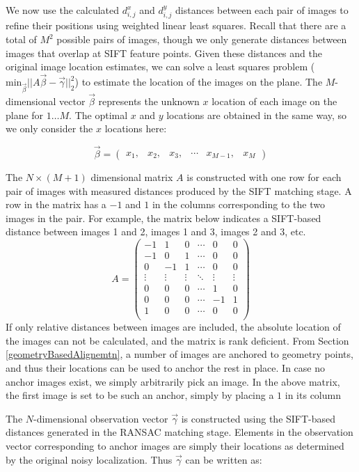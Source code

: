 \documentclass[]{spie}  %
\begin{document}
We now use the calculated $d^x_{i,j}$ and $d^y_{i,j}$ distances
between each pair of images to refine their positions using weighted
linear least squares. Recall that there are a total of $M^{2}$
possible pairs of images, though we only generate distances between
images that overlap at SIFT feature points. Given these distances and
the original image location estimates, we can solve a least squares
problem ($\textrm{min}_{\vec{\beta}} ||A \vec{\beta} -
\vec{\gamma}||_2^2 $) to estimate the location of the images on the
plane. The $M$-dimensional vector $\vec{\beta}$ represents the unknown
$x$ location of each image on the plane for $1 \dots M$. The optimal
$x$ and $y$ locations are obtained in the same way, so we only
consider the $x$ locations here:

\[\vec{\beta} =
\begin{pmatrix}
  x_1, & x_2, & x_3, & \cdots & x_{M-1}, & x_M
\end{pmatrix}
\]

The $N \times (M+1)$ dimensional matrix $A$ is constructed with one
row for each pair of images with measured distances produced by the
SIFT matching stage. A row in the matrix has a $-1$ and $1$ in the
columns corresponding to the two images in the pair. For example, the
matrix below indicates a SIFT-based distance between images 1 and 2,
images 1 and 3, images 2 and 3, etc.
\[
A =
\begin{pmatrix}
  -1 & 1 & 0 & \cdots & 0 & 0\\
  -1 & 0 & 1 & \cdots & 0 & 0\\
  0 & -1 & 1 & \cdots & 0 & 0\\
  \vdots  & \vdots & \vdots & \ddots & \vdots  & \vdots\\
  0 & 0 & 0 & \cdots & 1 & 0 \\
  0 & 0 & 0 & \cdots & -1 & 1 \\
  1 & 0 & 0 & \cdots & 0 & 0 \\
\end{pmatrix}
\]
If only relative distances between images are included, the absolute
location of the images can not be calculated, and the matrix is rank
deficient. From Section \ref{geometryBasedAlignemtn}, a number of
images are anchored to geometry points, and thus their locations can
be used to anchor the rest in place. In case no anchor images exist,
we simply arbitrarily pick an image. In the above matrix, the first
image is set to be such an anchor, simply by placing a $1$ in its
column

The $N$-dimensional observation vector $\vec{\gamma}$ is constructed
using the SIFT-based distances generated in the RANSAC matching
stage. Elements in the observation vector corresponding to anchor
images are simply their locations as determined by the original noisy
localization. Thus $\vec{\gamma}$ can be written as:
\end{document}
